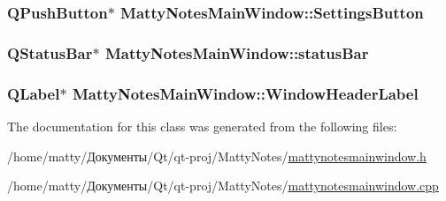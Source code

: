 \subsubsection[{\texorpdfstring{Settings\+Button}{SettingsButton}}]{\setlength{\rightskip}{0pt plus 5cm}Q\+Push\+Button$\ast$ Matty\+Notes\+Main\+Window\+::\+Settings\+Button\hspace{0.3cm}{\ttfamily [private]}}\hypertarget{class_matty_notes_main_window_ad9cb13412434d6fc084b5ead14b48356}{}\label{class_matty_notes_main_window_ad9cb13412434d6fc084b5ead14b48356}
\subsubsection[{\texorpdfstring{status\+Bar}{statusBar}}]{\setlength{\rightskip}{0pt plus 5cm}Q\+Status\+Bar$\ast$ Matty\+Notes\+Main\+Window\+::status\+Bar\hspace{0.3cm}{\ttfamily [private]}}\hypertarget{class_matty_notes_main_window_acccc534f50bac336cd6fabdba5406c12}{}\label{class_matty_notes_main_window_acccc534f50bac336cd6fabdba5406c12}
\subsubsection[{\texorpdfstring{Window\+Header\+Label}{WindowHeaderLabel}}]{\setlength{\rightskip}{0pt plus 5cm}Q\+Label$\ast$ Matty\+Notes\+Main\+Window\+::\+Window\+Header\+Label\hspace{0.3cm}{\ttfamily [private]}}\hypertarget{class_matty_notes_main_window_a615bd7bd2d770a4d0b97f09c71e32333}{}\label{class_matty_notes_main_window_a615bd7bd2d770a4d0b97f09c71e32333}


The documentation for this class was generated from the following files\+:\begin{DoxyCompactItemize}
\item 
/home/matty/Документы/\+Qt/qt-\/proj/\+Matty\+Notes/\hyperlink{mattynotesmainwindow_8h}{mattynotesmainwindow.\+h}\item 
/home/matty/Документы/\+Qt/qt-\/proj/\+Matty\+Notes/\hyperlink{mattynotesmainwindow_8cpp}{mattynotesmainwindow.\+cpp}\end{DoxyCompactItemize}
